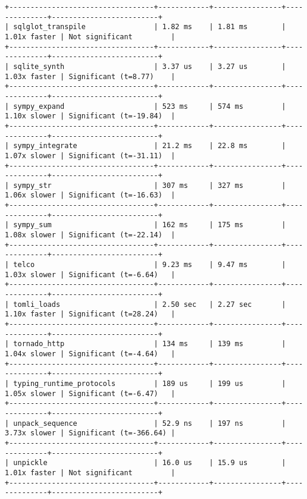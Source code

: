 \begin{code}
\begin{verbatim}
+----------------------------------+------------+----------------+--------------+-------------------------+
| sqlglot_transpile                | 1.82 ms    | 1.81 ms        | 1.01x faster | Not significant         |
+----------------------------------+------------+----------------+--------------+-------------------------+
| sqlite_synth                     | 3.37 us    | 3.27 us        | 1.03x faster | Significant (t=8.77)    |
+----------------------------------+------------+----------------+--------------+-------------------------+
| sympy_expand                     | 523 ms     | 574 ms         | 1.10x slower | Significant (t=-19.84)  |
+----------------------------------+------------+----------------+--------------+-------------------------+
| sympy_integrate                  | 21.2 ms    | 22.8 ms        | 1.07x slower | Significant (t=-31.11)  |
+----------------------------------+------------+----------------+--------------+-------------------------+
| sympy_str                        | 307 ms     | 327 ms         | 1.06x slower | Significant (t=-16.63)  |
+----------------------------------+------------+----------------+--------------+-------------------------+
| sympy_sum                        | 162 ms     | 175 ms         | 1.08x slower | Significant (t=-22.14)  |
+----------------------------------+------------+----------------+--------------+-------------------------+
| telco                            | 9.23 ms    | 9.47 ms        | 1.03x slower | Significant (t=-6.64)   |
+----------------------------------+------------+----------------+--------------+-------------------------+
| tomli_loads                      | 2.50 sec   | 2.27 sec       | 1.10x faster | Significant (t=28.24)   |
+----------------------------------+------------+----------------+--------------+-------------------------+
| tornado_http                     | 134 ms     | 139 ms         | 1.04x slower | Significant (t=-4.64)   |
+----------------------------------+------------+----------------+--------------+-------------------------+
| typing_runtime_protocols         | 189 us     | 199 us         | 1.05x slower | Significant (t=-6.47)   |
+----------------------------------+------------+----------------+--------------+-------------------------+
| unpack_sequence                  | 52.9 ns    | 197 ns         | 3.73x slower | Significant (t=-366.64) |
+----------------------------------+------------+----------------+--------------+-------------------------+
| unpickle                         | 16.0 us    | 15.9 us        | 1.01x faster | Not significant         |
+----------------------------------+------------+----------------+--------------+-------------------------+

\end{verbatim}
\end{code}
